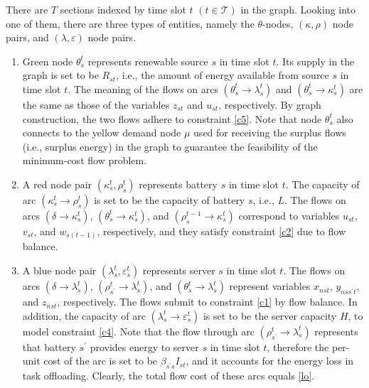 \documentclass[conference, 10pt, ﬁnal, letterpaper, twocolumn]{IEEEtran}
\begin{document}
There are $T$ sections indexed by time slot $t$ $(t\in \mathcal{T})$ in the graph. Looking into one of them, there are three types of entities, namely the $\theta$-nodes, $(\kappa, \rho)$ node pairs, and $(\lambda, \varepsilon)$ node pairs.
\begin{enumerate}
    \item Green node $\theta^{t}_{s}$ represents renewable source $s$ in time slot $t$. Its supply in the graph is set to be $R_{st}$, i.e., the amount of energy available from source $s$ in time slot $t$. The meaning of the flows on arcs $(\theta^{t}_{s}\rightarrow \lambda^{t}_{s})$ and $(\theta^{t}_{s}\rightarrow \kappa^{t}_{s})$ are the same as those of the variables $z_{st}$ and $u_{st}$, respectively. By graph construction, the two flows adhere to constraint \eqref{c5}. Note that node $\theta^{t}_{s}$ also connects to the yellow demand node $\mu$ used for receiving the surplus flows (i.e., surplus energy) in the graph to guarantee the feasibility of the minimum-cost flow problem.
    \item A red node pair $(\kappa^{t}_{s}, \rho^{t}_{s})$ represents battery $s$ in time slot $t$. The capacity of arc $(\kappa^{t}_{s}\rightarrow \rho^{t}_{s})$ is set to be the capacity of battery $s$, i.e., $L$. The flows on arcs $(\delta \rightarrow \kappa^{t}_{s})$, $(\theta^{t}_{s} \rightarrow \kappa^{t}_{s})$, and $(\rho^{t-1}_{s}\rightarrow \kappa^{t}_{s})$ correspond to variables $u_{st}$, $v_{st}$, and $w_{s(t-1)}$, respectively, and they satisfy constraint \eqref{c2} due to flow balance.
    \item A blue node pair $(\lambda^{t}_{s}, \varepsilon^{t}_{s})$ represents server $s$ in time slot $t$. The flows on arcs $(\delta \rightarrow \lambda^{t}_{s})$, $(\rho^{t}_{s^\prime} \rightarrow \lambda^{t}_{s})$, and $(\theta^{t}_{s} \rightarrow \lambda^{t}_{s} )$ represent variables $x_{nst}$, $y_{nss^\prime t}$, and $z_{nst}$, respectively. The flows submit to constraint \eqref{c1} by flow balance. In addition, the capacity of arc $(\lambda^{t}_{s}\rightarrow\varepsilon^{t}_{s})$ is set to be the server capacity $H$, to model constraint \eqref{c4}. Note that the flow through arc $(\rho^{t}_{s^\prime}\rightarrow\lambda^{t}_{s})$ represents that battery $s^\prime$ provides energy to server $s$ in time slot $t$, therefore the per-unit cost of the arc is set to be $\beta_{s^\prime s} I_{st}$, and it accounts for the energy loss in task offloading. Clearly, the total flow cost of these arcs equals \eqref{lo}.
\end{enumerate}
\end{document}
